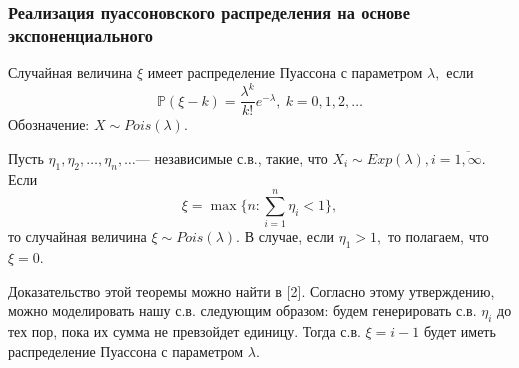 \documentclass[11pt]{article}
\begin{document}
	\subsubsection{Реализация пуассоновского распределения на основе экспоненциального }
	\begin{opr}
		Случайная величина $\xi$ имеет распределение Пуассона с параметром $\lambda,$ если 
		\[ \mathbb{P}(\xi - k) = \frac{\lambda^k}{k!}e^{-\lambda}, \ k = 0,1,2,
		\dots \]
		Обозначение: $X \sim Pois(\lambda).$
	\end{opr}
	\begin{theorem}
		Пусть  $\eta_1,\eta_2, \dots, \eta_n,\dots $--- независимые с.в., такие, что $X_i \sim Exp(\lambda), i = \overline{1,\infty}.$ Если 
		\[\xi = \max\{n: \sum_{i = 1}^{n}\eta_i < 1\},\]
		то случайная величина $\xi \sim Pois(\lambda).$ В случае, если $\eta_1 > 1,$ то полагаем, что $\xi = 0.$
	\end{theorem}
    Доказательство этой теоремы можно найти в [2].
    \newline
    Согласно этому утверждению, можно моделировать нашу с.в. следующим образом: будем генерировать с.в. $\eta_i$ до тех пор, пока их сумма не превзойдет единицу. Тогда с.в. $\xi = i - 1$ будет иметь распределение Пуассона с параметром $\lambda.$
\end{document}
